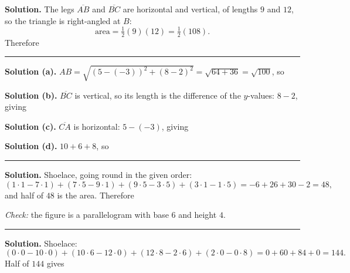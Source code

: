 \documentclass[12pt]{article}
\begin{document}




\noindent\textbf{Solution.} The legs $\overline{AB}$ and $\overline{BC}$ are
horizontal and vertical, of lengths $9$ and $12$, so the triangle is right-angled
at $B$:
\[ \text{area} = \tfrac{1}{2}(9)(12) = \tfrac{1}{2}(108) . \]
Therefore 

\vspace{0.15cm}\noindent\rule{\linewidth}{0.2pt}


\noindent\textbf{Solution (a).} $AB = \sqrt{(5-(-3))^2 + (8-2)^2}
= \sqrt{64+36} = \sqrt{100}$, so 

\noindent\textbf{Solution (b).} $\overline{BC}$ is vertical, so its length is the
difference of the $y$-values: $8 - 2$, giving 

\noindent\textbf{Solution (c).} $\overline{CA}$ is horizontal:
$5 - (-3)$, giving 

\noindent\textbf{Solution (d).} $10 + 6 + 8$, so

\vspace{0.15cm}\noindent\rule{\linewidth}{0.2pt}


\noindent\textbf{Solution.} Shoelace, going round in the given order:
\[ (1\cdot 1 - 7\cdot 1) + (7\cdot 5 - 9\cdot 1) + (9\cdot 5 - 3\cdot 5)
   + (3\cdot 1 - 1\cdot 5) = -6 + 26 + 30 - 2 = 48 , \]
and half of $48$ is the area. Therefore 

\noindent\textit{Check:} the figure is a parallelogram with base $6$ and height
$4$.

\vspace{0.15cm}\noindent\rule{\linewidth}{0.2pt}


\noindent\textbf{Solution.} Shoelace:
\[ (0\cdot 0 - 10\cdot 0) + (10\cdot 6 - 12\cdot 0) + (12\cdot 8 - 2\cdot 6)
   + (2\cdot 0 - 0\cdot 8) = 0 + 60 + 84 + 0 = 144 . \]
Half of $144$ gives 
\end{document}

